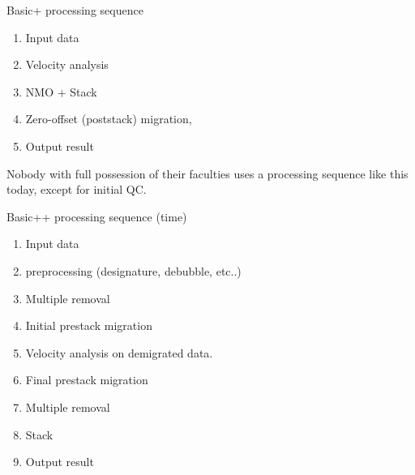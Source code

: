 \documentclass[xcolor=dvipsnames,notes]{beamer}
\begin{document}
\begin{frame}{Basic+ processing sequence}
\begin{enumerate}
  \item Input data
  \item Velocity analysis
  \item NMO + Stack
  \item Zero-offset (poststack) migration,
  \item Output result
\end{enumerate}
Nobody with full possession of their faculties uses 
a processing sequence like this today, except for initial QC.
\end{frame}
\begin{frame}{Basic++ processing sequence (time)}
\begin{enumerate}
  \item Input data
  \item preprocessing (designature, debubble, etc..)
  \item Multiple removal
  \item Initial prestack migration
  \item Velocity analysis on demigrated data.
  \item Final prestack migration
  \item Multiple removal
  \item Stack
  \item Output result
\end{enumerate}
\end{frame}
\end{document}
